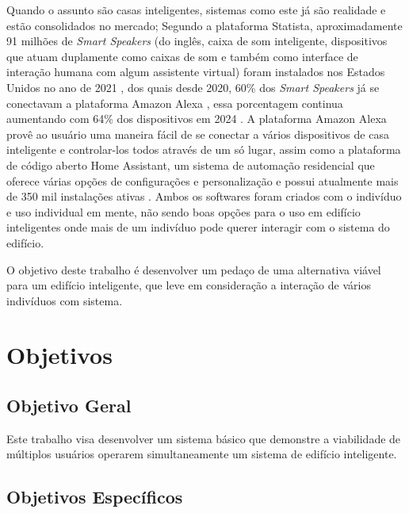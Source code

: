 \documentclass[
	12pt,				%
	a4paper,			%
	english,			%
	brazil,				%
	]{article}
\begin{document}
Quando o assunto são casas inteligentes, sistemas como este já são realidade e estão consolidados no mercado; Segundo a plataforma
Statista, aproximadamente 91 milhões de \emph{Smart Speakers} {(}do inglês, caixa de som inteligente, dispositivos que atuam 
duplamente como caixas de som e também como interface de interação humana com algum assistente virtual{)} foram instalados nos 
Estados Unidos no ano de 2021 \cite{statista1}, dos quais desde 2020, 60\% dos \emph{Smart Speakers} já se conectavam a plataforma
Amazon Alexa \cite{statista2}, essa porcentagem continua aumentando com 64\% dos dispositivos em 2024 \cite{statista3}.
A plataforma Amazon Alexa provê ao usuário uma maneira fácil de se conectar a vários dispositivos de
casa inteligente e controlar-los todos através de um só lugar, assim como a plataforma de código aberto Home Assistant, um sistema de
automação residencial \cite{assistant_home_nodate} que oferece várias opções de configurações e personalização e possui atualmente
mais de 350 mil instalações ativas \cite{home_assistant1}. Ambos os softwares foram criados com o indivíduo e uso individual em mente, não sendo
boas opções para o uso em edifício inteligentes onde mais de um indivíduo pode querer interagir com o sistema do edifício.

O objetivo deste trabalho é desenvolver um pedaço de uma alternativa viável para um edifício inteligente, que leve em consideração a interação
de vários indivíduos com sistema.


\section{Objetivos}
\subsection{Objetivo Geral}

Este trabalho visa desenvolver um sistema básico que demonstre a viabilidade de múltiplos usuários operarem simultaneamente 
um sistema de edifício inteligente.


\subsection{Objetivos Específicos}
\end{document}
